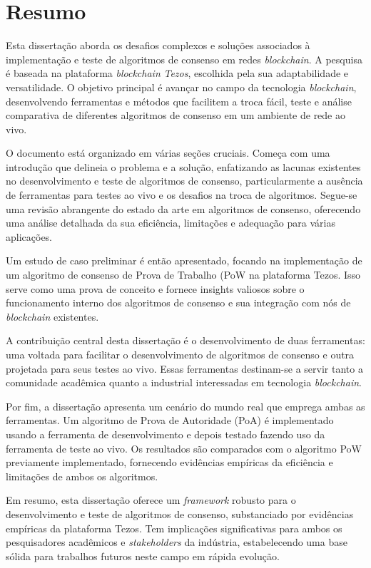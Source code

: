 \chapter*{Resumo}

Esta dissertação aborda os desafios complexos e soluções associados à implementação e teste de algoritmos de consenso em redes \textit{blockchain}. A pesquisa é baseada na plataforma \textit{blockchain} \textit{Tezos}, escolhida pela sua adaptabilidade e versatilidade. O objetivo principal é avançar no campo da tecnologia \textit{blockchain}, desenvolvendo ferramentas e métodos que facilitem a troca fácil, teste e análise comparativa de diferentes algoritmos de consenso em um ambiente de rede ao vivo.

O documento está organizado em várias seções cruciais. Começa com uma introdução que delineia o problema e a solução, enfatizando as lacunas existentes no desenvolvimento e teste de algoritmos de consenso, particularmente a ausência de ferramentas para testes ao vivo e os desafios na troca de algoritmos. 
Segue-se uma revisão abrangente do estado da arte em algoritmos de consenso, oferecendo uma análise detalhada da sua eficiência, limitações e adequação para várias aplicações.

Um estudo de caso preliminar é então apresentado, focando na implementação de um algoritmo de consenso de Prova de Trabalho (PoW na plataforma Tezos. Isso serve como uma prova de conceito e fornece insights valiosos sobre o funcionamento interno dos algoritmos de consenso e sua integração com nós de \textit{blockchain} existentes.

A contribuição central desta dissertação é o desenvolvimento de duas ferramentas: uma voltada para facilitar o desenvolvimento de algoritmos de consenso e outra projetada para seus testes ao vivo. Essas ferramentas destinam-se a servir tanto a comunidade acadêmica quanto a industrial interessadas em tecnologia \textit{blockchain}.

Por fim, a dissertação apresenta um cenário do mundo real que emprega ambas as ferramentas. Um algoritmo de Prova de Autoridade (PoA) é implementado usando a ferramenta de desenvolvimento e depois testado  fazendo uso da ferramenta de teste ao vivo. Os resultados são comparados com o algoritmo PoW previamente implementado, fornecendo evidências empíricas da eficiência e limitações de ambos os algoritmos.

Em resumo, esta dissertação oferece um \textit{framework} robusto para o desenvolvimento e teste de algoritmos de consenso, substanciado por evidências empíricas da plataforma Tezos. Tem implicações significativas para ambos os pesquisadores acadêmicos e \textit{stakeholders} da indústria, estabelecendo uma base sólida para trabalhos futuros neste campo em rápida evolução.
